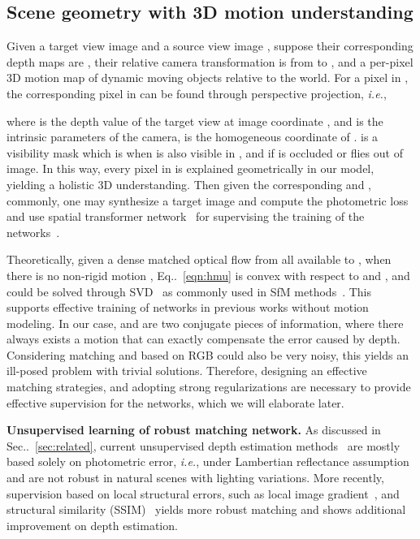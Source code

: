 \documentclass[runningheads]{llncs}
\makeatletter
\newcommand{\equref}[1]{Eq\onedot~\eqref{#1}}
\newcommand{\secref}[1]{Sec\onedot~\ref{#1}}
\DeclareRobustCommand\onedot{\futurelet\@let@token\@onedot}
\def\onedot{\ifx\@let@token.\else.\null\fi\xspace}
\def\ie{\emph{i.e.}}
\makeatother
\begin{document}
\vspace{-0.5\baselineskip}
\subsection{Scene geometry with 3D motion understanding}
\label{subsec:scene_geometry}
 Given a target view image  and a source view image , suppose their corresponding depth maps are , their relative camera  
 transformation is  from  to , and 
 a per-pixel 3D motion map of dynamic moving objects  relative to the world.
 For a pixel  in , the corresponding pixel  in  can be found through perspective projection, \ie , 

where  is the depth value of the target view at image coordinate , and  is the intrinsic parameters of the camera,  is the homogeneous coordinate of .  is a visibility mask which is  when  is also visible in , and  if  is occluded or flies out of image. In this way, every pixel in  is explained geometrically in our model, yielding a holistic 3D understanding. Then given the corresponding  and , commonly, one may synthesize a target image  and compute the photometric loss  and use spatial transformer network~\cite{jaderberg2015spatial} for supervising the training of the networks~\cite{zhou2017unsupervised}.

Theoretically, given a dense matched optical flow from all available  to , when there is no non-rigid motion , \equref{eqn:hmu} is convex with respect to  and , and could be solved through SVD~\cite{tomasi1992shape} as commonly used in SfM methods~\cite{wu2011visualsfm}. This supports effective training of networks in previous works without motion modeling. 
In our case,  and  are two conjugate pieces of information, where there always exists a motion that can exactly compensate the error caused by depth. Considering matching  and  based on RGB could also be very noisy, this yields an ill-posed problem with trivial solutions.  Therefore, designing an effective matching strategies, and adopting strong regularizations are necessary to provide effective supervision for the networks, which we will elaborate later.

\noindent\textbf{Unsupervised learning of robust matching network.} As discussed in \secref{sec:related}, current unsupervised depth estimation methods~\cite{zhou2017unsupervised,wang2017learning,li2017undeepvo,mahjourian2018unsupervised,yang2018cvpr} are mostly based solely on photometric error, \ie , under Lambertian reflectance assumption and are not robust in natural scenes with lighting variations. More recently, supervision based on local structural errors, such as local image gradient~\cite{yang2018aaai}, and structural similarity (SSIM)~\cite{wang2004image,godard2016unsupervised,yin2018geonet} yields more robust matching and shows additional improvement on depth estimation. 
\end{document}
